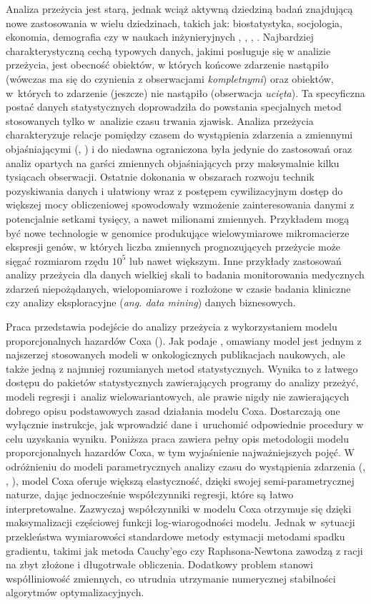Analiza przeżycia jest starą, jednak wciąż aktywną dziedziną badań znajdującą nowe zastosowania w wielu dziedzinach, takich jak: biostatystyka, socjologia, ekonomia, demografia czy w naukach inżynieryjnych \cite{heckman}, \cite{collett}, \cite{boxst}, \cite{hosmer}. Najbardziej charakterystyczną cechą typowych danych, jakimi posługuje się w analizie przeżycia, jest obecność obiektów, w których końcowe zdarzenie nastąpiło (wówczas ma się do czynienia z obserwacjami \textit{kompletnymi}) oraz obiektów, w~których to zdarzenie (jeszcze) nie nastąpiło (obserwacja \textit{ucięta}). Ta specyficzna postać danych statystycznych doprowadziła do powstania specjalnych metod stosowanych tylko w~analizie czasu trwania zjawisk. Analiza przeżycia charakteryzuje relacje pomiędzy czasem do wystąpienia zdarzenia a zmiennymi objaśniającymi (\cite{kalf}, \cite{oakes}) i do niedawna ograniczona była jedynie do zastosowań oraz analiz opartych na garści zmiennych objaśniających przy maksymalnie kilku tysiącach obserwacji. Ostatnie dokonania w obszarach rozwoju technik pozyskiwania danych i ułatwiony wraz z postępem cywilizacyjnym dostęp do większej mocy obliczeniowej spowodowały wzmożenie zainteresowania danymi z potencjalnie setkami tysięcy, a nawet milionami zmiennych. Przykładem mogą być nowe technologie w genomice produkujące wielowymiarowe mikromacierze ekspresji genów, w których liczba zmiennych prognozujących przeżycie może sięgać rozmiarom rzędu $10^5$ lub nawet większym. Inne przykłady zastosowań analizy przeżycia dla danych wielkiej skali to badania monitorowania medycznych zdarzeń niepożądanych, wielopomiarowe i rozłożone w czasie badania kliniczne czy analizy eksploracyjne (\textit{ang. data mining}) danych biznesowych.

Praca przedstawia podejście do analizy przeżycia z wykorzystaniem modelu proporcjonalnych hazardów Coxa (\cite{cox}). Jak podaje \cite{assel}, omawiany model jest jednym z najszerzej stosowanych modeli w onkologicznych publikacjach naukowych, ale także jedną z najmniej rozumianych metod statystycznych. Wynika to z łatwego dostępu do pakietów statystycznych zawierających programy do analizy przeżyć, modeli regresji i~analiz wielowariantowych, ale prawie nigdy nie zawierających dobrego opisu podstawowych zasad działania modelu Coxa. Dostarczają one wyłącznie instrukcje, jak wprowadzić dane i~uruchomić odpowiednie procedury w celu uzyskania wyniku. Poniższa praca zawiera pełny opis metodologii modelu proporcjonalnych hazardów Coxa, w tym wyjaśnienie najważniejszych pojęć. W odróżnieniu do modeli parametrycznych analizy czasu do wystąpienia zdarzenia (\cite{klein}, \cite{collett}, \cite{hosmer}), model Coxa oferuje większą elastyczność, dzięki swojej semi-parametrycznej naturze, dając jednocześnie  współczynniki regresji, które są łatwo interpretowalne. Zazwyczaj współczynniki w modelu Coxa otrzymuje się dzięki maksymalizacji częściowej funkcji log-wiarogodności modelu. Jednak w~sytuacji przekleństwa wymiarowości standardowe metody estymacji metodami spadku gradientu, takimi jak metoda Cauchy'ego czy Raphsona-Newtona zawodzą z racji na zbyt złożone i długotrwałe obliczenia. Dodatkowy problem stanowi współliniowość zmiennych, co utrudnia utrzymanie numerycznej stabilności algorytmów optymalizacyjnych. 

